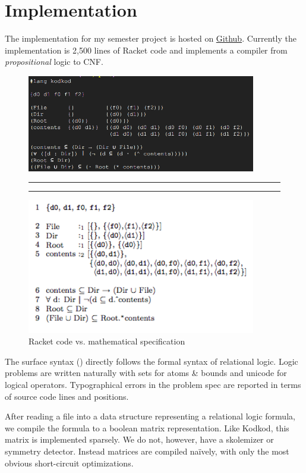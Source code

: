 \section{Implementation}
\label{sec:compile}

The implementation for my semester project is hosted on \href{https://github.com/bennn/rkt-kodkod}{Github}.
Currently the implementation is 2,500 lines of Racket code and implements a compiler from \emph{propositional} logic to CNF.

\begin{figure}
\includegraphics[width=10cm]{rkt.png}

  \vspace{0.1cm}
  \hrule\hrule

\includegraphics[width=10cm]{fs.png}
\caption{Racket code vs. mathematical specification}
\label{fig:lang}
\end{figure}

The surface syntax () directly follows the formal syntax of relational logic.
Logic problems are written naturally with sets for atoms \& bounds and
 unicode for logical operators.
Typographical errors in the problem spec are reported in terms of source code
 lines and positions.

After reading a file into a data structure representing a relational logic
 formula, we compile the formula to a boolean matrix representation.
Like Kodkod, this matrix is implemented sparsely.
We do not, however, have a skolemizer or symmetry detector.
Instead matrices are compiled na\"ively, with only the most obvious short-circuit
 optimizations.

